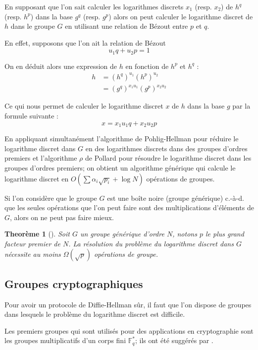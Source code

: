 \documentclass[a4paper,12pt]{article}
\newtheorem{theoreme}{Theorème}[section]
\theoremstyle{definition}
\theoremstyle{remark}
\numberwithin{equation}{section}
\begin{document}
En supposant que l'on sait calculer les logarithmes discrets $x_1$ (resp. $x_2$) de $h^q$ (resp. $h^p$) dans la base $g^q$ (resp. $g^p$) alors on peut calculer le logarithme discret de $h$ dans le groupe $G$ en utilisant une relation de Bézout entre $p$ et $q$. 

En effet, supposons que l'on ait la relation de Bézout
$$u_1 q + u_2 p = 1$$

On en déduit alors une expression de $h$ en fonction de $h^p$ et $h^q$ :
\begin{align*}
h &= (h^q)^{u_1}(h^p)^{u_2} \\
  &= (g^q)^{x_1u_1}(g^p)^{x_2u_2}
\end{align*}

Ce qui nous permet de calculer le logarithme discret $x$ de $h$ dans la base $g$ par la formule suivante :
$$x = x_1 u_1 q + x_2 u_2 p$$

En appliquant simultanément l'algorithme de Pohlig-Hellman pour réduire le logarithme discret dans $G$ en des logarithmes discrets dans des groupes d'ordres premiers et l'algorithme $\rho$ de Pollard pour résoudre le logarithme discret dans les groupes d'ordres premiers; on obtient un algorithme générique qui calcule le logarithme discret en $O(\sum{\alpha_i\sqrt{p_i}}+\log N)$ opérations de groupes.

Si l'on considère que le groupe $G$ est une boîte noire (groupe générique) c.-à-d. que les seules opérations que l'on peut faire sont des multiplications d'éléments de $G$, alors on ne peut pas faire mieux.

\begin{theoreme}[\citet{shoup}]
\label{borneShoup}
Soit $G$ un groupe générique d'ordre $N$, notons $p$ le plus grand facteur premier de $N$. La résolution du problème du logarithme discret dans $G$ nécessite au moins $\Omega(\sqrt{p})$ opérations de groupe. 
\end{theoreme}

\subsection{Groupes cryptographiques}
Pour avoir un protocole de Diffie-Hellman sûr, il faut que l'on dispose de groupes dans lesquels le problème du logarithme discret est difficile.

Les premiers groupes qui sont utilisés pour des applications en cryptographie sont les groupes multiplicatifs d'un corps fini $\mathbb{F}^*_q$; ils ont été suggérés par \citet{diffie-hellman}.
\end{document}
